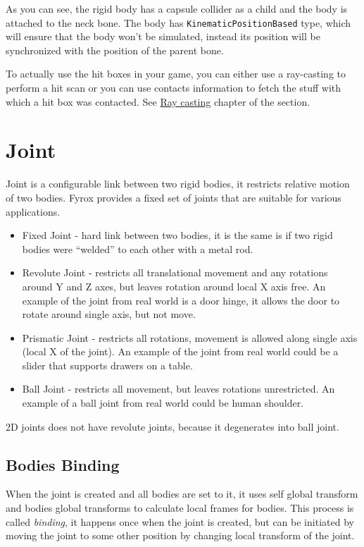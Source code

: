 \documentclass[
]{book}
\providecommand{\tightlist}{%
  \setlength{\itemsep}{0pt}\setlength{\parskip}{0pt}}
\theoremstyle{definition}
\theoremstyle{definition}
\theoremstyle{definition}
\theoremstyle{definition}
\theoremstyle{remark}
\begin{document}
As you can see, the rigid body has a capsule collider as a child and the body is attached to the neck bone. The body has \texttt{KinematicPositionBased} type, which will ensure that the body won't be simulated, instead its position will be synchronized with the position of the parent bone.

To actually use the hit boxes in your game, you can either use a ray-casting to perform a hit scan or you can use contacts information to fetch the stuff with which a hit box was contacted. See \href{./ray.md}{Ray casting} chapter of the section.

\section{Joint}\label{joint}

Joint is a configurable link between two rigid bodies, it restricts relative motion of two bodies. Fyrox provides a fixed set of joints that are suitable for various applications.

\begin{itemize}
\tightlist
\item
  Fixed Joint - hard link between two bodies, it is the same is if two rigid bodies were ``welded'' to each other with a metal rod.
\item
  Revolute Joint - restricts all translational movement and any rotations around Y and Z axes, but leaves rotation around local X axis free. An example of the joint from real world is a door hinge, it allows the door to rotate around single axis, but not move.
\item
  Prismatic Joint - restricts all rotations, movement is allowed along single axis (local X of the joint). An example of the joint from real world could be a slider that supports drawers on a table.
\item
  Ball Joint - restricts all movement, but leaves rotations unrestricted. An example of a ball joint from real world could be human shoulder.
\end{itemize}

2D joints does not have revolute joints, because it degenerates into ball joint.

\subsection{Bodies Binding}\label{bodies-binding}

When the joint is created and all bodies are set to it, it uses self global transform and bodies global transforms to calculate local frames for bodies. This process is called \emph{binding}, it happens once when the joint is created, but can be initiated by moving the joint to some other position by changing local transform of the joint.
\end{document}
